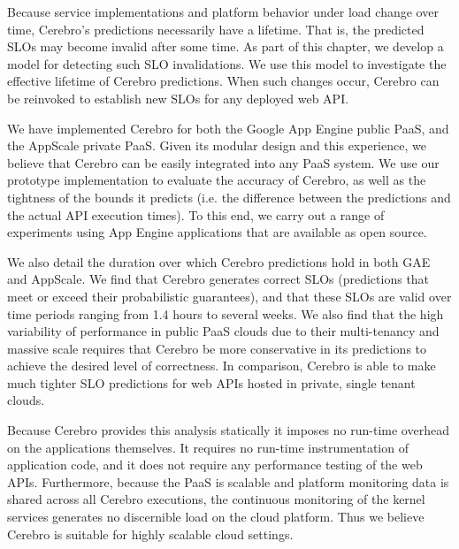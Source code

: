 Because service implementations and platform behavior under load change over time,
Cerebro's predictions necessarily have a lifetime. That is, the predicted SLOs may
become invalid after some time.  
As part of this chapter, we develop a model for detecting such SLO invalidations. 
We use this model to investigate
the effective lifetime of Cerebro predictions. When such changes occur,
Cerebro can be reinvoked to establish new SLOs for any deployed web API.  

We have implemented Cerebro for both the Google App Engine public PaaS, and 
the AppScale private PaaS. Given its modular design and this experience, 
we believe that Cerebro can be easily integrated into any PaaS system.
We use our prototype implementation to evaluate the accuracy of Cerebro, 
as well as the tightness
of the bounds it predicts (i.e. the difference between the predictions and 
the actual API execution times). To this end, we carry out a range of experiments
 using App Engine applications that are available as open source.  

We also detail the duration over which 
Cerebro predictions hold in both GAE and AppScale.  
We find that Cerebro generates correct SLOs (predictions that meet or exceed their
probabilistic guarantees), and that these SLOs are valid over time periods ranging
from 1.4 hours to several weeks.  
We also find that the high variability of performance in public PaaS clouds due to their multi-tenancy
and massive scale requires that Cerebro be more conservative in its predictions 
to achieve the desired level of correctness. In comparison, Cerebro is able to make
much tighter SLO predictions for web APIs hosted in private, single tenant clouds.

Because Cerebro provides this 
analysis statically it imposes no run-time overhead on the applications
themselves. It requires no run-time instrumentation of application code,
and it does not require any performance testing of the web APIs.
Furthermore, because the PaaS is scalable and platform monitoring data is 
shared across all Cerebro executions, the continuous monitoring of the
kernel services generates no discernible load on the cloud platform.
Thus we believe Cerebro is suitable for highly scalable cloud
settings.

